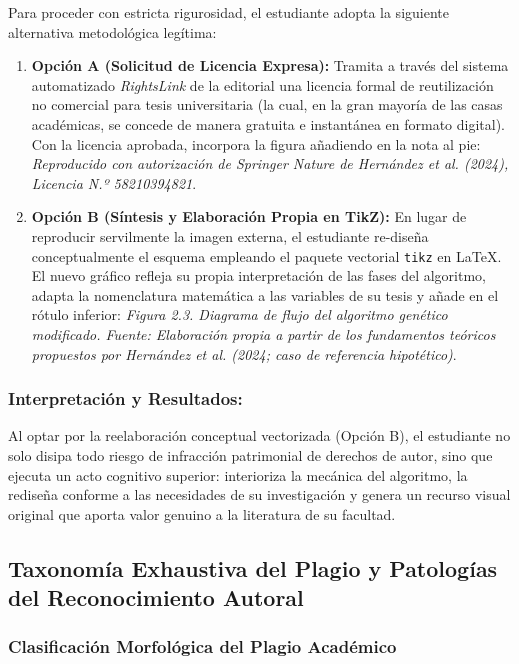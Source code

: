 Para proceder con estricta rigurosidad, el estudiante adopta la siguiente alternativa metodológica legítima:
\begin{enumerate}
    \item \textbf{Opción A (Solicitud de Licencia Expresa):} Tramita a través del sistema automatizado \textit{RightsLink} de la editorial una licencia formal de reutilización no comercial para tesis universitaria (la cual, en la gran mayoría de las casas académicas, se concede de manera gratuita e instantánea en formato digital). Con la licencia aprobada, incorpora la figura añadiendo en la nota al pie: \textsl{\guillemotleft Reproducido con autorización de Springer Nature de Hernández et al. (2024), Licencia N.º 58210394821\guillemotright}.
    \item \textbf{Opción B (Síntesis y Elaboración Propia en TikZ):} En lugar de reproducir servilmente la imagen externa, el estudiante re-diseña conceptualmente el esquema empleando el paquete vectorial \texttt{tikz} en \LaTeX. El nuevo gráfico refleja su propia interpretación de las fases del algoritmo, adapta la nomenclatura matemática a las variables de su tesis y añade en el rótulo inferior: \textsl{\guillemotleft Figura 2.3. Diagrama de flujo del algoritmo genético modificado. Fuente: Elaboración propia a partir de los fundamentos teóricos propuestos por Hernández et al. (2024; caso de referencia hipotético)\guillemotright}.
\end{enumerate}

\subsubsection*{Interpretación y Resultados:}
Al optar por la reelaboración conceptual vectorizada (Opción B), el estudiante no solo disipa todo riesgo de infracción patrimonial de derechos de autor, sino que ejecuta un acto cognitivo superior: interioriza la mecánica del algoritmo, la rediseña conforme a las necesidades de su investigación y genera un recurso visual original que aporta valor genuino a la literatura de su facultad.

\subsection{Taxonomía Exhaustiva del Plagio y Patologías del Reconocimiento Autoral}

\subsubsection{Clasificación Morfológica del Plagio Académico}

